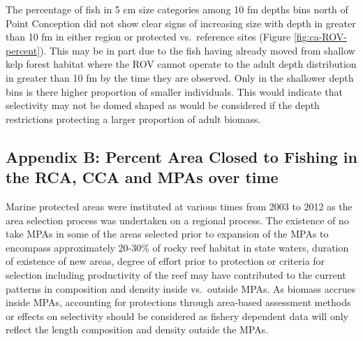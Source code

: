 \documentclass[11pt,
  english,
  a4paper,
]{article}
\begin{document}
\leavevmode\tagmcend\tagstructend\par


The percentage of fish in 5 cm size categories among 10 fm depths bins north of Point Conception did not show clear signs of increasing size with depth in greater than 10 fm in either region or protected vs.~reference sites (Figure \ref{fig:ca-ROV-percent}). This may be in part due to the fish having already moved from shallow kelp forest habitat where the ROV cannot operate to the adult depth distribution in greater than 10 fm by the time they are observed. Only in the shallower depth bins is there higher proportion of smaller individuals. This would indicate that selectivity may not be domed shaped as would be considered if the depth restrictions protecting a larger proportion of adult biomass.

\leavevmode\tagmcend\tagstructend\par


\hypertarget{appendix-b-percent-area-closed-to-fishing-in-the-rca-cca-and-mpas-over-time}{%
\subsection{Appendix B: Percent Area Closed to Fishing in the RCA, CCA and MPAs over time}\label{appendix-b-percent-area-closed-to-fishing-in-the-rca-cca-and-mpas-over-time}}

\leavevmode\tagmcend\tagstructend


Marine protected areas were instituted at various times from 2003 to 2012 as the area selection process was undertaken on a regional process. The existence of no take MPAs in some of the areas selected prior to expansion of the MPAs to encompass approximately 20-30\% of rocky reef habitat in state waters, duration of existence of new areas, degree of effort prior to protection or criteria for selection including productivity of the reef may have contributed to the current patterns in composition and density inside vs.~outside MPAs. As biomass accrues inside MPAs, accounting for protections through area-based assessment methods or effects on selectivity should be considered as fishery dependent data will only reflect the length composition and density outside the MPAs.

\leavevmode\tagmcend\tagstructend\par
\end{document}
